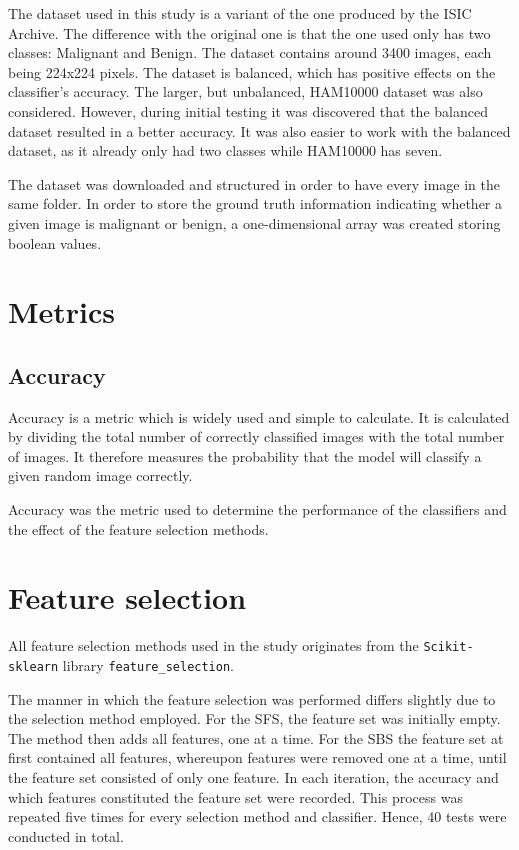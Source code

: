 \documentclass{kththesis}
\begin{document}
The dataset used in this study is a variant of the one produced by the ISIC Archive. The difference with the original one is that the one used only has two classes: Malignant and Benign. The dataset contains around 3400 images, each being 224x224 pixels. The dataset is balanced, which has positive effects on the classifier's accuracy. The larger, but unbalanced, HAM10000 dataset was also considered. However, during initial testing it was discovered that the balanced dataset resulted in a better accuracy. It was also easier to work with the balanced dataset, as it already only had two classes while HAM10000 has seven.

The dataset was downloaded and structured in order to have every image in the same folder. In order to store the ground truth information indicating whether a given image is malignant or benign, a one-dimensional array was created storing boolean values.

\section{Metrics}

\subsection{Accuracy}

Accuracy is a metric which is widely used and simple to calculate.  
It is calculated by dividing the total number of correctly classified images with the total number of images. 
It therefore measures the probability that the model will classify a given random image correctly. \parencite{takiddin2021artificial}

Accuracy was the metric used to determine the performance of the classifiers and the effect of the feature selection methods.


\section{Feature selection}

All feature selection methods used in the study originates from the \verb|Scikit-sklearn| library \verb|feature_selection|.

The manner in which the feature  selection was performed differs slightly due to the selection method employed. For the SFS, the feature set was initially empty. The method then adds all features, one at a time. For the SBS the feature set at first contained all features, whereupon features were removed one at a time, until the feature set consisted of only one feature. In each iteration, the accuracy and which features constituted the feature set were recorded. 
This process was repeated five times for every selection method and classifier. Hence, 40 tests were conducted in total.
\end{document}
